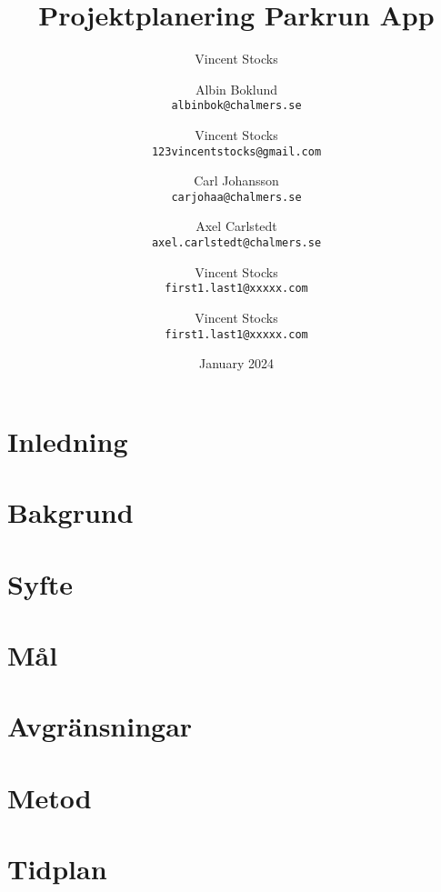 \documentclass{article}
\title{Projektplanering Parkrun App}
\author{Vincent Stocks}
\author{
    Albin Boklund\\
    \texttt{albinbok@chalmers.se}
    \and
    Vincent Stocks\\
    \texttt{123vincentstocks@gmail.com}
    \and
    Carl Johansson\\
    \texttt{carjohaa@chalmers.se}
    \and
    Axel Carlstedt\\
    \texttt{axel.carlstedt@chalmers.se}
    \and
    Vincent Stocks\\
    \texttt{first1.last1@xxxxx.com}
    \and
    Vincent Stocks\\
    \texttt{first1.last1@xxxxx.com}
}
\date{January 2024}
\begin{document}
\maketitle

\newpage
\tableofcontents
\section{Inledning}

\section{Bakgrund}
\section{Syfte}

\section{Mål}

\section{Avgränsningar}



\section{Metod}

\section{Tidplan}
\end{document}
